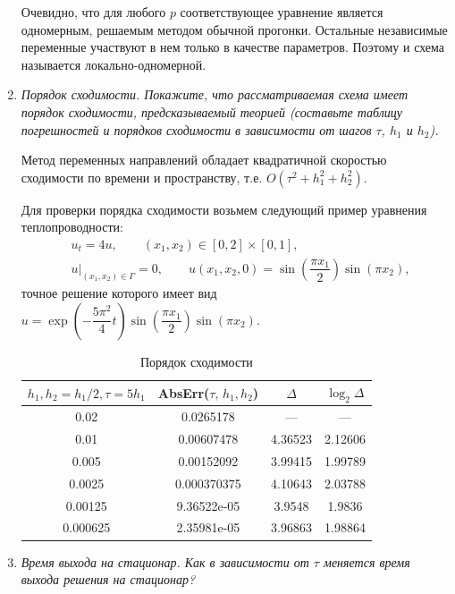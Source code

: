 \documentclass[12pt, a4paper]{article}
\begin{document}
\begin{enumerate}
		Очевидно, что для любого $p$ соответствующее уравнение является одномерным, решаемым методом обычной прогонки. Остальные независимые переменные участвуют в нем только в качестве параметров. Поэтому и схема называется локально-одномерной.
		
		\item \textit{Порядок сходимости. Покажите, что рассматриваемая схема имеет порядок сходимости, предсказываемый теорией (составьте таблицу погрешностей и порядков сходимости в зависимости от шагов $\tau$, $h_1$ и $h_2$).}
		\smallskip
		
		Метод переменных направлений обладает квадратичной скоростью сходимости по времени и пространству, т.е. $O(\tau^2+h_1^2+h_2^2)$.
		
		Для проверки порядка сходимости возьмем следующий пример уравнения теплопроводности:
		\begin{eqnarray*}
			& u_t = \mathcal{4}u, \qquad (x_1, x_2) \in [0, 2]\times [0, 1],\\
			& u\Big|_{(x_1, x_2) \in \Gamma} = 0, \qquad u(x_1, x_2, 0) = \sin\left(\dfrac{\pi x_1}2\right) \sin(\pi x_2),
		\end{eqnarray*}
		точное решение которого имеет вид $u = \exp\left(-\dfrac{5\pi^2}4 t\right)\sin\left(\dfrac{\pi x_1}2\right) \sin(\pi x_2)$.
		
		\begin{table}[H]
			\caption{Порядок сходимости}
			\centering
			\begin{tabular}{|c|c|c|c|}\hline
				$h_1, h_2 = h_1 / 2, \tau = 5 h_1$ & AbsErr($\tau,\,h_1, h_2$) & $\Delta$ & $\log_2 \Delta$\\ 
				\hline
				0.02 & 0.0265178 & --- & --- \\
				\hline
				0.01 & 0.00607478 & 4.36523 & 2.12606\\
				\hline
				0.005 & 0.00152092 & 3.99415 & 1.99789 \\
				\hline
				0.0025 & 0.000370375 & 4.10643 & 2.03788 \\
				\hline
				0.00125 & 9.36522e-05 & 3.9548 & 1.9836 \\
				\hline
				0.000625 & 2.35981e-05 & 3.96863 & 1.98864 \\
				\hline
			\end{tabular}
		\end{table}
		
		\item \textit{Время выхода на стационар. Как в зависимости от $\tau$ меняется время выхода решения на стационар?}
		\smallskip
		

\end{enumerate}
\end{document}
